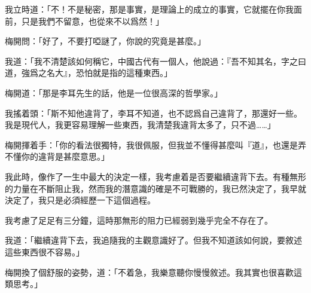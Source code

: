 我立時道：「不！不是秘密，那是事實，是理論上的成立的事實，它就擺在你我面前，只是我們不留意，也從來不以爲然！」

梅開問：「好了，不要打啞謎了，你說的究竟是甚麼。」

我道：「我不清楚該如何稱它，中國古代有一個人，他說過：『吾不知其名，字之曰道，強爲之名大』，恐怕就是指的這種東西。」

梅開道：「那是李耳先生的話，他是一位很高深的哲學家。」

我搖着頭：「斯不知他違背了，李耳不知道，也不認爲自己違背了，那還好一些。我是現代人，我更容易理解一些東西，我清楚我違背太多了，只不過……」

梅開揮着手：「你的看法很獨特，我很佩服，但我並不懂得甚麼叫『道』，也還是弄不懂你的違背是甚麼意思。」

我此時，像作了一生中最大的決定一樣，我考慮着是否要繼續違背下去。有種無形的力量在不斷阻止我，然而我的潛意識的確是不可戰勝的，我已然決定了，我早就決定了，我只是必須經歷一下這個過程。

我考慮了足足有三分鐘，這時那無形的阻力已經弱到幾乎完全不存在了。

我道：「繼續違背下去，我追隨我的主觀意識好了。但我不知道該如何說，要敘述這些東西很不容易。」

梅開換了個舒服的姿勢，道：「不着急，我樂意聽你慢慢敘述。我其實也很喜歡這類思考。」


